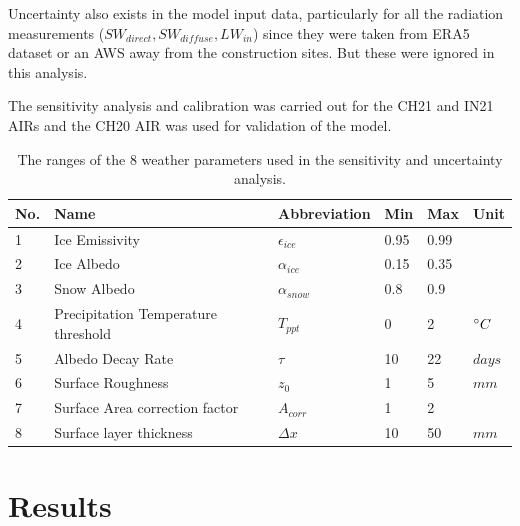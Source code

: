 \documentclass[utf8]{frontiersSCNS} %
\begin{document}
Uncertainty also exists in the model input data, particularly for all the radiation measurements ($SW_{direct},
	SW_{diffuse}, LW_{in}$) since they were taken from ERA5 dataset or an AWS away from the construction sites.
But these were ignored in this analysis.

The sensitivity analysis and calibration was carried out for the CH21 and IN21 AIRs and the CH20 AIR was used for
validation of the model.

\begin{table}
	\centering
	\caption{The ranges of the 8 weather parameters used in the sensitivity and uncertainty analysis.}
	\label{tab:parameters}
	\begin{tabular}{@{}llllll@{}}
		\toprule
		\textbf{No.} & \textbf{Name}                       & \textbf{Abbreviation} & \textbf{Min} & \textbf{Max} & \textbf{Unit} \\\midrule
		1            & Ice Emissivity                      & $\epsilon_{ice}$      & 0.95         & 0.99         &               \\
		2            & Ice Albedo                          & $\alpha_{ice}$        & 0.15         & 0.35         &               \\
		3            & Snow Albedo                         & $\alpha_{snow}$       & 0.8          & 0.9          &               \\
		4            & Precipitation Temperature threshold & $T_{ppt}$             & 0            & 2            & $\degree C$   \\
		5            & Albedo Decay Rate                   & $\tau$                & 10           & 22           & $days$        \\
		6            & Surface Roughness                   & $z_0$                 & 1            & 5            & $mm$          \\
		7            & Surface Area correction factor      & $A_{corr}$            & 1            & 2            &               \\
		8            & Surface layer thickness             & $\Delta x$            & 10           & 50           & $mm$          \\\bottomrule
	\end{tabular}
\end{table}

\section{Results}
\end{document}
